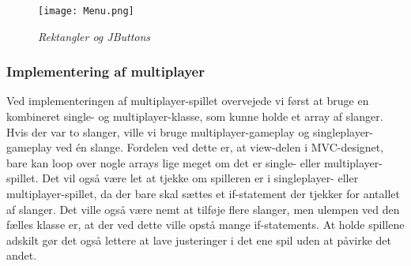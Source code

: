 \begin{figure}[h]
	\centering
	\texttt{[image: Menu.png]}
	\caption{\textit{Rektangler og JButtons}}
\end{figure}

\subsubsection{Implementering af multiplayer}
Ved implementeringen af multiplayer-spillet overvejede vi først at bruge en kombineret single- og multiplayer-klasse, som kunne holde et array af slanger. Hvis der var to slanger, ville vi bruge multiplayer-gameplay og singleplayer-gameplay ved én slange. Fordelen ved dette er, at view-delen i MVC-designet, bare kan loop over nogle arrays lige meget om det er single- eller multiplayer-spillet. Det vil også være let at tjekke om spilleren er i singleplayer- eller multiplayer-spillet, da der bare skal sættes et if-statement der tjekker for antallet af slanger. Det ville også være nemt at tilføje flere slanger, men ulempen ved den fælles klasse er, at der ved dette ville opstå mange if-statements. At holde spillene adskilt gør det også lettere at lave justeringer i det ene spil uden at påvirke det andet.